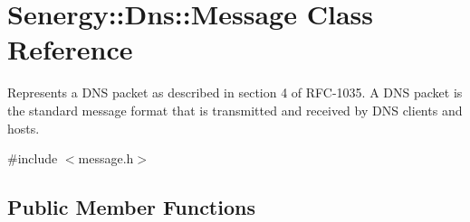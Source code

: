 \hypertarget{class_senergy_1_1_dns_1_1_message}{\section{Senergy\-:\-:Dns\-:\-:Message Class Reference}
\label{class_senergy_1_1_dns_1_1_message}
}


Represents a D\-N\-S packet as described in section 4 of R\-F\-C-\/1035. A D\-N\-S packet is the standard message format that is transmitted and received by D\-N\-S clients and hosts.  




{\ttfamily \#include $<$message.\-h$>$}

\subsection*{Public Member Functions}
